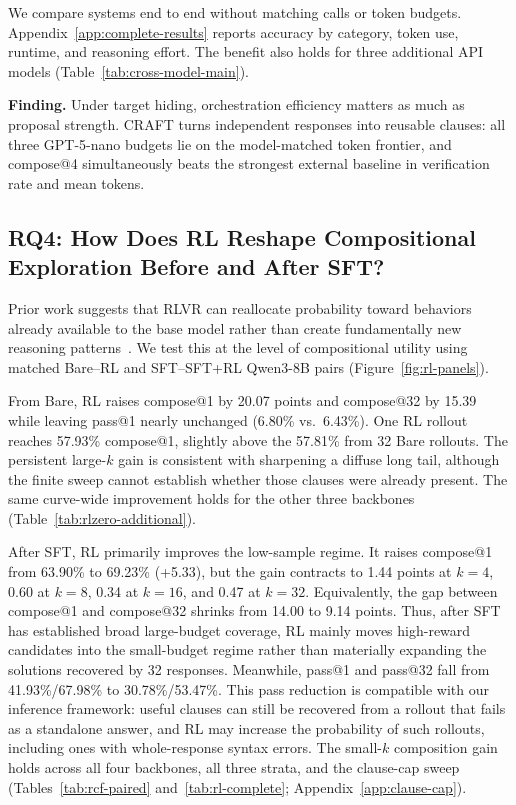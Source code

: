 We compare systems end to end without matching calls or token
budgets.  Appendix~\ref{app:complete-results} reports accuracy by category,
token use, runtime, and reasoning effort.  The benefit also holds for three
additional API models (Table~\ref{tab:cross-model-main}).

\begin{insightbox}
\textbf{Finding.}
Under target hiding, orchestration efficiency matters as much as proposal
strength.  CRAFT turns independent responses into reusable clauses: all three
GPT-5-nano budgets lie on the model-matched token frontier, and compose@4
simultaneously beats the strongest external baseline in verification rate and
mean tokens.
\end{insightbox}

\subsection{RQ4: How Does RL Reshape Compositional Exploration Before and After SFT?}
\label{sec:exp:rl}

Prior work suggests that RLVR can reallocate probability toward behaviors
already available to the base model rather than create fundamentally new
reasoning patterns~\citep{yue2025rlcapacity}.  We test this at the level of
compositional utility using matched Bare--RL and SFT--SFT+RL Qwen3-8B pairs
(Figure~\ref{fig:rl-panels}).

From Bare, RL raises compose@1 by 20.07 points and compose@32 by 15.39 while
leaving pass@1 nearly unchanged (6.80\% vs.\ 6.43\%).  One RL rollout reaches
57.93\% compose@1, slightly above the 57.81\% from 32 Bare rollouts.  The
persistent large-\(k\) gain is consistent with sharpening a diffuse long tail,
although the finite sweep cannot establish whether those clauses were already
present.  The same curve-wide improvement holds for the other three backbones
(Table~\ref{tab:rlzero-additional}).

After SFT, RL primarily improves the low-sample regime.  It raises compose@1
from 63.90\% to 69.23\% (+5.33), but the gain contracts to 1.44
points at \(k{=}4\), 0.60 at \(k{=}8\), 0.34 at \(k{=}16\), and 0.47 at
\(k{=}32\).  Equivalently, the gap between compose@1 and compose@32 shrinks
from 14.00 to 9.14 points.  Thus, after SFT has established broad
large-budget coverage, RL mainly moves high-reward candidates into the
small-budget regime rather than materially expanding the solutions recovered
by 32 responses.  Meanwhile, pass@1 and pass@32 fall from
41.93\%/67.98\% to 30.78\%/53.47\%.
This pass reduction is compatible with our inference framework: useful
clauses can still be recovered from a rollout that fails as a standalone
answer, and RL may increase the probability of such rollouts, including ones
with whole-response syntax errors.
The small-\(k\) composition gain holds across all four backbones, all three
strata, and the clause-cap sweep (Tables~\ref{tab:rcf-paired}
and~\ref{tab:rl-complete}; Appendix~\ref{app:clause-cap}).

